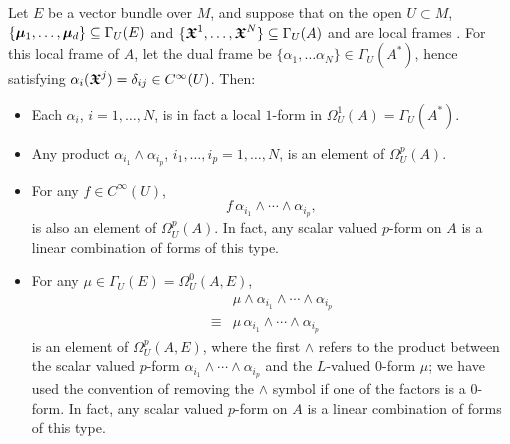 \begin{example}
Let $E$ be a vector bundle over $M$, and suppose that on the open $U \subset M$, $\{\bm{\mu}_1, \dots, \bm{\mu}_d\} \subseteq \Gamma_U(E)$ and $\{\bm{\mathfrak{X}}^1, \dots, \bm{\mathfrak{X}}^N\} \subseteq \Gamma_U(A)$ and  are local frames
. For this local frame of $A$, let the dual frame be $\{\alpha_1, \dots \alpha_N\} \in \Gamma_U(A^*)$, hence satisfying $\alpha_i(\bm{\mathfrak{X}}^j) = \delta_{ij} \in C^\infty(U)$. Then:

    \begin{itemize}
        
    \item Each $\alpha_i$, $i = 1, \dots, N$, is in fact a local $1$-form in $\Omega_U^1(A) = \Gamma_U(A^*)$.
    
    \item Any product $\alpha_{i_1} \wedge \alpha_{i_p}$, $i_1, \dots, i_p = 1, \dots, N$, is an element of $\Omega_U^p(A)$.
    
    \item For any $f \in C^\infty(U)$, 
    \begin{equation}
        f\, \alpha_{i_1} \wedge \cdots \wedge \alpha_{i_p},
    \end{equation} 
    is also an element of $\Omega_U^p(A)$. In fact, any scalar valued $p$-form on $A$ is a linear combination of forms of this type.
    
    \item For any $\mu \in \Gamma_U(E) = \Omega_U^0(A, E)$, 
    \begin{align}
        &\mu \wedge \alpha_{i_1} \wedge \cdots \wedge \alpha_{i_p}\\
        \equiv & \mu \, \alpha_{i_1} \wedge \cdots \wedge \alpha_{i_p}
    \end{align}
     is an element of $\Omega_U^p(A, E)$, where the first $\wedge$ refers to the product between the scalar valued $p$-form $\alpha_{i_1} \wedge \cdots \wedge \alpha_{i_p}$ and the $L$-valued $0$-form $\mu$; we have used the convention of removing the $\wedge$ symbol if one of the factors is a $0$-form. In fact, any scalar valued $p$-form on $A$ is a linear combination of forms of this type.
        
    \end{itemize}
\end{example}


